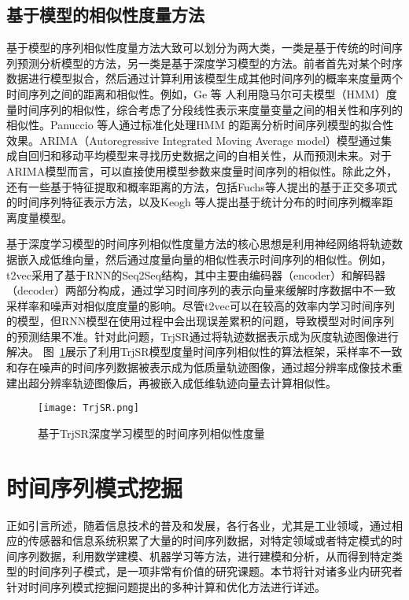 \subsection{基于模型的相似性度量方法}
基于模型的序列相似性度量方法大致可以划分为两大类，一类是基于传统的时间序列预测分析模型的方法，另一类是基于深度学习模型的方法。前者首先对某个时序数据进行模型拟合，然后通过计算利用该模型生成其他时间序列的概率来度量两个时间序列之间的距离和相似性。例如，Ge 等 人利用隐马尔可夫模型（HMM）度量时间序列的相似性，综合考虑了分段线性表示来度量变量之间的相关性和序列的相似性。Panuccio 等人通过标准化处理HMM 的距离分析时间序列模型的拟合性效果。ARIMA（Autoregressive Integrated Moving Average model）模型通过集成自回归和移动平均模型来寻找历史数据之间的自相关性，从而预测未来。对于ARIMA模型而言，可以直接使用模型参数来度量时间序列的相似性。除此之外，还有一些基于特征提取和概率距离的方法，包括Fuchs等人提出的基于正交多项式的时间序列特征表示方法，以及Keogh 等人提出基于统计分布的时间序列概率距离度量模型。

基于深度学习模型的时间序列相似性度量方法的核心思想是利用神经网络将轨迹数据嵌入成低维向量，然后通过度量向量的相似性表示时间序列的相似性。例如，t2vec采用了基于RNN的Seq2Seq结构，其中主要由编码器（encoder）和解码器（decoder）两部分构成，通过学习时间序列的表示向量来缓解时序数据中不一致采样率和噪声对相似度度量的影响。尽管t2vec可以在较高的效率内学习时间序列的模型，但RNN模型在使用过程中会出现误差累积的问题，导致模型对时间序列的预测结果不准。针对此问题，TrjSR通过将轨迹数据表示成为灰度轨迹图像进行解决。
图~\ref{fig:TrjSR}展示了利用TrjSR模型度量时间序列相似性的算法框架，采样率不一致和存在噪声的时间序列数据被表示成为低质量轨迹图像，通过超分辨率成像技术重建出超分辨率轨迹图像后，再被嵌入成低维轨迹向量去计算相似性。
\begin{figure}
  \centering
  \texttt{[image: TrjSR.png]}
  \caption{基于TrjSR深度学习模型的时间序列相似性度量}
  \label{fig:TrjSR}
\end{figure}

\section{时间序列模式挖掘}
正如引言所述，随着信息技术的普及和发展，各行各业，尤其是工业领域，通过相应的传感器和信息系统积累了大量的时间序列数据，对特定领域或者特定模式的时间序列数据，利用数学建模、机器学习等方法，进行建模和分析，从而得到特定类型的时间序列子模式，是一项非常有价值的研究课题。本节将针对诸多业内研究者针对时间序列模式挖掘问题提出的多种计算和优化方法进行详述。

